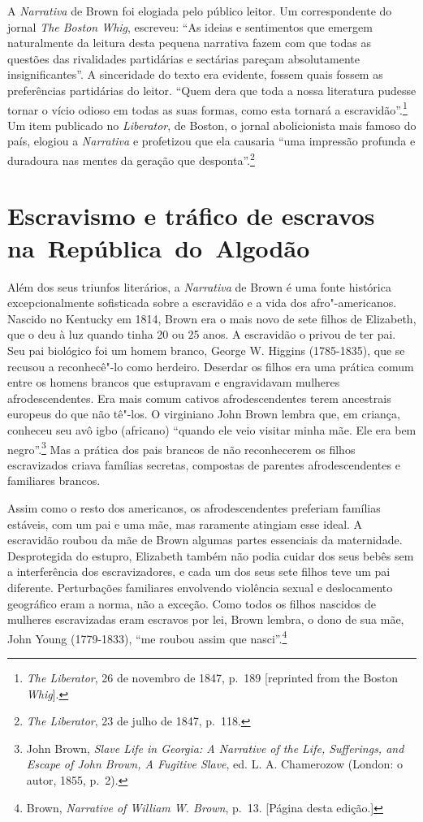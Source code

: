 A \emph{Narrativa} de Brown foi elogiada pelo público leitor. Um
correspondente do jornal \emph{The Boston Whig}, escreveu: ``As ideias e
sentimentos que emergem naturalmente da leitura desta pequena narrativa
fazem com que todas as questões das rivalidades partidárias e sectárias
pareçam absolutamente insignificantes''. A sinceridade do texto era
evidente, fossem quais fossem as preferências partidárias do leitor.
``Quem dera que toda a nossa literatura pudesse tornar o vício odioso em
todas as suas formas, como esta tornará a escravidão''.\footnote{\emph{The
  Liberator}, 26 de novembro de 1847, p.~189 {[}reprinted from the Boston
  \emph{Whig}{]}.} Um item publicado no \emph{Liberator}, de Boston, o
jornal abolicionista mais famoso do país, elogiou a \emph{Narrativa} e
profetizou que ela causaria ``uma impressão profunda e duradoura nas
mentes da geração que desponta''.\footnote{\emph{The Liberator}, 23 de
  julho de 1847, p.~118.}

\section{Escravismo e tráfico de escravos na~República~do~Algodão}

Além dos seus triunfos literários, a \emph{Narrativa} de Brown é uma
fonte histórica excepcionalmente sofisticada sobre a escravidão e a vida
dos afro"-americanos. Nascido no Kentucky em 1814, Brown era o mais novo
de sete filhos de Elizabeth, que o deu à luz quando tinha 20 ou 25 anos.
A escravidão o privou de ter pai. Seu pai biológico foi um homem branco,
George W. Higgins (1785-1835), que se recusou a reconhecê"-lo como
herdeiro. Deserdar os filhos era uma prática comum entre os homens
brancos que estupravam e engravidavam mulheres afrodescendentes. Era
mais comum cativos afrodescendentes terem ancestrais europeus do que não
tê"-los. O virginiano John Brown lembra que, em criança, conheceu seu avô
igbo (africano) ``quando ele veio visitar minha mãe. Ele era bem
negro''.\footnote{John Brown, \emph{Slave Life in Georgia: A Narrative
  of the Life, Sufferings, and Escape of John Brown, A Fugitive Slave},
  ed. L. A. Chamerozow (London: o autor, 1855, p.~2).} Mas a prática dos
pais brancos de não reconhecerem os filhos escravizados criava famílias
secretas, compostas de parentes afrodescendentes e familiares brancos.

Assim como o resto dos americanos, os afrodescendentes preferiam
famílias estáveis, com um pai e uma mãe, mas raramente atingiam esse
ideal. A escravidão roubou da mãe de Brown algumas partes essenciais da
maternidade. Desprotegida do estupro, Elizabeth também não podia cuidar
dos seus bebês sem a interferência dos escravizadores, e cada um dos
seus sete filhos teve um pai diferente. Perturbações familiares
envolvendo violência sexual e deslocamento geográfico eram a norma, não
a exceção. Como todos os filhos nascidos de mulheres escravizadas eram
escravos por lei, Brown lembra, o dono de sua mãe, John Young
(1779-1833), ``me roubou assim que nasci''.\footnote{Brown,
  \emph{Narrative of William W. Brown}, p.~13. {[}Página \pageref{ref5} desta
  edição.{]}}

